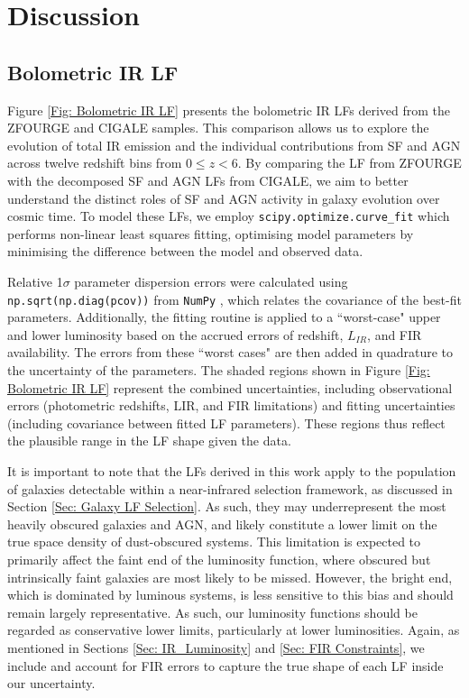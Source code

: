 \section{Discussion} \label{Sec: Discussion}
\subsection{Bolometric IR LF} \label{Sec: Bolometric IR LF}

Figure \ref{Fig: Bolometric IR LF} presents the bolometric IR LFs derived from the ZFOURGE and CIGALE samples. This comparison allows us to explore the evolution of total IR emission and the individual contributions from SF and AGN across twelve redshift bins from $0 \leq z < 6$. By comparing the LF from ZFOURGE with the decomposed SF and AGN LFs from CIGALE, we aim to better understand the distinct roles of SF and AGN activity in galaxy evolution over cosmic time. To model these LFs, we employ \texttt{scipy.optimize.curve\_fit} \citep{virtanen_scipy_2020} which performs non-linear least squares fitting, optimising model parameters by minimising the difference between the model and observed data. 

Relative 1$\sigma$ parameter dispersion errors were calculated using \texttt{np.sqrt(np.diag(pcov))} from \texttt{NumPy} \citep{harris_array_2020}, which relates the covariance of the best-fit parameters. Additionally, the fitting routine is applied to a ``worst-case" upper and lower luminosity based on the accrued errors of redshift, $L_{IR}$, and FIR availability. The errors from these ``worst cases" are then added in quadrature to the uncertainty of the parameters. The shaded regions shown in Figure \ref{Fig: Bolometric IR LF} represent the combined uncertainties, including observational errors (photometric redshifts, LIR, and FIR limitations) and fitting uncertainties (including covariance between fitted LF parameters). These regions thus reflect the plausible range in the LF shape given the data.

It is important to note that the LFs derived in this work apply to the population of galaxies detectable within a near-infrared selection framework, as discussed in Section \ref{Sec: Galaxy LF Selection}. As such, they may underrepresent the most heavily obscured galaxies and AGN, and likely constitute a lower limit on the true space density of dust-obscured systems. This limitation is expected to primarily affect the faint end of the luminosity function, where obscured but intrinsically faint galaxies are most likely to be missed. However, the bright end, which is dominated by luminous systems, is less sensitive to this bias and should remain largely representative. As such, our luminosity functions should be regarded as conservative lower limits, particularly at lower luminosities. Again, as mentioned in Sections \ref{Sec: IR_Luminosity} and \ref{Sec: FIR Constraints}, we include and account for FIR errors to capture the true shape of each LF inside our uncertainty.



